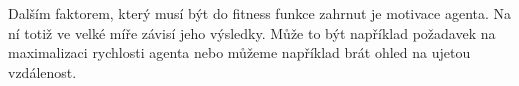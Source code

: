 Dalším faktorem, který musí být do fitness funkce zahrnut je motivace agenta. Na ní totiž ve velké míře závisí jeho výsledky. Může to být například požadavek na maximalizaci rychlosti agenta nebo můžeme například brát ohled na ujetou vzdálenost.

